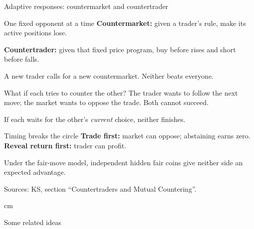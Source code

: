 \documentclass{beamer}
\newcommand{\sourcefoot}[1]{%
  \par\vfill{\fontsize{6.3}{7.5}\selectfont\color{black!65}Sources: #1\par}}
\begin{document}
\begin{frame}{Adaptive responses: countermarket and countertrader}
\small
\begin{block}{One fixed opponent at a time}
\textbf{Countermarket:} given a trader's rule, make its active positions lose.
\par\smallskip
\textbf{Countertrader:} given that fixed price program, buy before rises
and short before falls.
\par\smallskip
A new trader calls for a new countermarket. Neither beats everyone.
\end{block}
\begin{exampleblock}{What if each tries to counter the other?}
The trader wants to follow the next move; the market wants to oppose
the trade. Both cannot succeed.
\par\smallskip
If each waits for the other's \emph{current} choice, neither finishes.
\end{exampleblock}
\begin{alertblock}{Timing breaks the circle}
\textbf{Trade first:} market can oppose; abstaining earns zero.\\
\textbf{Reveal return first:} trader can profit.
\par\smallskip
Under the fair-move model, independent hidden fair coins give
neither side an expected advantage.
\end{alertblock}
\sourcefoot{KS, section \enquote{Countertraders and Mutual Countering}.}
\end{frame}

\begin{frame}
 cm
\begin{center}
\Large\color{blue}Some related ideas
\end{center}
\end{frame}
\end{document}
